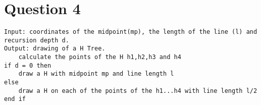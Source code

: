 \documentclass{article}[18pt]
\begin{document}
\section{Question 4}
\begin{lstlisting}
Input: coordinates of the midpoint(mp), the length of the line (l) and recursion depth d.
Output: drawing of a H Tree.
	calculate the points of the H h1,h2,h3 and h4
if d = 0 then
	draw a H with midpoint mp and line length l
else
	draw a H on each of the points of the h1...h4 with line length l/2
end if
\end{lstlisting}
\end{document}
